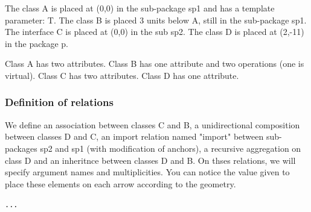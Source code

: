 \documentclass[a4paper,11pt]{report}
\begin{document}
The class A is placed at (0,0) in the sub-package sp1 and has a template parameter: T. The class B is placed 3 units below A, still in the sub-package sp1. The interface C is placed at (0,0) in the sub sp2.
The class D is placed at (2,-11) in the package p.

Class A has two attributes. Class B has one attribute and two operations (one is virtual). Class C has two attributes. Class D has one attribute.

\vspace{-0.4cm}
{\color{red!70!black}
	\vspace{-0.4cm}
}
\vspace{-0.4cm}
{\color{red!70!black}
	\vspace{-0.4cm}
}
\vspace{-0.4cm}
{\color{red!70!black}
	\vspace{-0.4cm}
}


\begin{center}
\end{center}


\subsubsection{Definition of relations}

We define an association between classes C and B, a unidirectional composition between classes D and C, an import relation named "import" between sub-packages sp2 and sp1 (with modification of anchors), a recursive aggregation on class D and an inheritnce between classes D and B. On thses relations, we will specify argument names and multiplicities. You can notice the value given to place
these elements on each arrow according to the geometry.

\medskip

\hspace{-0.7cm}\lstinline{...}
{\color{red!70!black}
	
}
\end{document}
